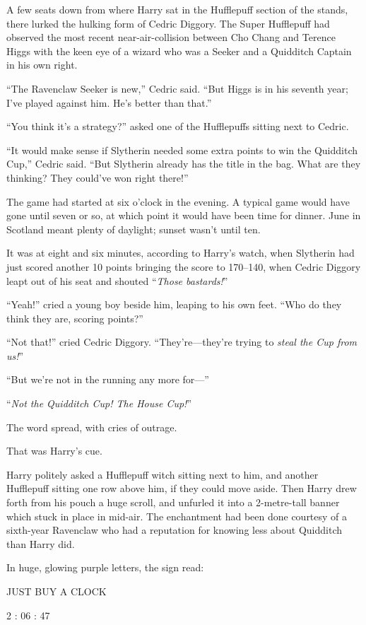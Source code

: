 A few seats down from where Harry sat in the Hufflepuff section of the stands, there lurked the hulking form of Cedric Diggory. The Super Hufflepuff had observed the most recent near-air-collision between Cho Chang and Terence Higgs with the keen eye of a wizard who was a Seeker and a Quidditch Captain in his own right.

“The Ravenclaw Seeker is new,” Cedric said. “But Higgs is in his seventh year; I’ve played against him. He’s better than that.”

“You think it’s a strategy?” asked one of the Hufflepuffs sitting next to Cedric.

“It would make sense if Slytherin needed some extra points to win the Quidditch Cup,” Cedric said. “But Slytherin already has the title in the bag. What are they thinking? They could’ve won right there!”

The game had started at six o’clock in the evening. A typical game would have gone until seven or so, at which point it would have been time for dinner. June in Scotland meant plenty of daylight; sunset wasn’t until ten.

It was at eight \pm and six minutes, according to Harry’s watch, when Slytherin had just scored another 10 points bringing the score to 170–{140}, when Cedric Diggory leapt out of his seat and shouted “\emph{Those bastards!}”

“Yeah!” cried a young boy beside him, leaping to his own feet. “Who do they think they are, scoring points?”

“Not that!” cried Cedric Diggory. “They’re—they’re trying to \emph{steal the Cup from us!}”

“But we’re not in the running any more for—”

“\emph{Not the Quidditch Cup! The House Cup!}”

The word spread, with cries of outrage.

That was Harry’s cue.

Harry politely asked a Hufflepuff witch sitting next to him, and another Hufflepuff sitting one row above him, if they could move aside. Then Harry drew forth from his pouch a huge scroll, and unfurled it into a 2-metre-tall banner which stuck in place in mid-air. The enchantment had been done courtesy of a sixth-year Ravenclaw who had a reputation for knowing less about Quidditch than Harry did.

In huge, glowing purple letters, the sign read:

\begin{center}
JUST BUY A CLOCK

2 : 06 : 47
\end{center}

